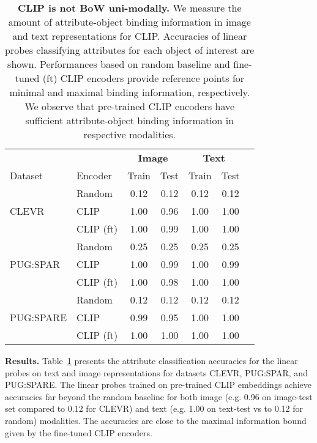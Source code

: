 \begin{table}
  \centering
    \small
  \setlength{\tabcolsep}{.8em}
  \begin{tabularx}{\columnwidth}{ll*{5}{c}}
    \toprule
    \multicolumn{2}{c}{} & \multicolumn{2}{c}{\textbf{Image}} & \multicolumn{2}{c}{\textbf{Text}} \\ \cmidrule(lr){3-4} \cmidrule(lr){5-6}
    Dataset & Encoder & Train & Test & Train & Test \\ \midrule
     & Random & 0.12 & 0.12 & 0.12 & 0.12 \\
    CLEVR & CLIP & 1.00 & 0.96 & 1.00 & 1.00 \\
     & CLIP (ft) & 1.00 & 0.99 & 1.00 & 1.00 \\ \midrule
     & Random & 0.25 & 0.25 & 0.25 & 0.25 \\
    PUG:SPAR & CLIP & 1.00 & 0.99 & 1.00 & 0.99 \\
     & CLIP (ft) & 1.00 & 0.98 & 1.00 & 1.00 \\ \midrule
     & Random & 0.12 & 0.12 & 0.12 & 0.12 \\
    PUG:SPARE & CLIP & 0.99 & 0.95 & 1.00 & 1.00 \\
     & CLIP (ft) & 1.00 & 1.00 & 1.00 & 1.00 \\ 
    \bottomrule
  \end{tabularx}
  \caption{\textbf{CLIP is not BoW uni-modally.} We measure the amount of attribute-object binding information in image and text representations for CLIP. Accuracies of linear probes classifying attributes for each object of interest are shown. Performances based on random baseline and fine-tuned (ft) CLIP encoders provide reference points for minimal and maximal binding information, respectively. We observe that pre-trained CLIP encoders have sufficient attribute-object binding information in respective modalities.}%
  \label{tab:probing}
  \vspace{-1em}
\end{table}

\noindent
\noindent
\textbf{Results.} Table~\ref{tab:probing} presents the attribute classification accuracies for the linear probes on text and image representations for datasets CLEVR, PUG:SPAR, and PUG:SPARE. The linear probes trained on pre-trained CLIP embeddings achieve accuracies far beyond the random baseline for both image (e.g. 0.96 on image-test set compared to 0.12 for CLEVR) and text (e.g. 1.00 on text-test vs to 0.12 for random) modalities. The accuracies are close to the maximal information bound given by the fine-tuned CLIP encoders. 

